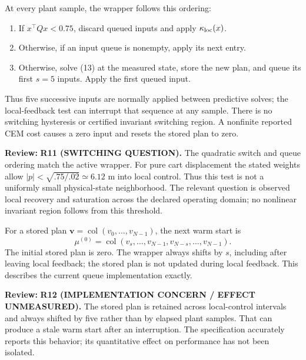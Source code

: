 \documentclass[11pt]{article}
\newcommand{\col}{\operatorname{col}}
\newcommand{\review}[1]{\par\noindent\textcolor{red!70!black}{\textbf{Review:} #1}\par}
\begin{document}
At every plant sample, the wrapper follows this ordering:
\begin{enumerate}
\item If $x^\top Qx<0.75$, discard queued inputs and apply $\kappa_{\rm loc}(x)$.
\item Otherwise, if an input queue is nonempty, apply its next entry.
\item Otherwise, solve (13) at the measured state, store the new plan, and queue its first $s=5$ inputs. Apply the first queued input.
\end{enumerate}
Thus five successive inputs are normally applied between predictive solves; the local-feedback test can interrupt that sequence at any sample. There is no switching hysteresis or certified invariant switching region. A nonfinite reported CEM cost causes a zero input and resets the stored plan to zero.
\review{\textbf{R11 (SWITCHING QUESTION).} The quadratic switch and queue ordering match the active wrapper. For pure cart displacement the stated weights allow $|p|<\sqrt{.75/.02}\simeq6.12$ m into local control. Thus this test is not a uniformly small physical-state neighborhood. The relevant question is observed local recovery and saturation across the declared operating domain; no nonlinear invariant region follows from this threshold.}


For a stored plan $\mathbf v=\col(v_0,\ldots,v_{N-1})$, the next warm start is
\begin{equation}\label{eq:warmstart}
\mu^{(0)}=\col(v_s,\ldots,v_{N-1},v_{N-s},\ldots,v_{N-1}).
\end{equation}
The initial stored plan is zero. The wrapper always shifts by $s$, including after leaving local feedback; the stored plan is not updated during local feedback. This describes the current queue implementation exactly.
\review{\textbf{R12 (IMPLEMENTATION CONCERN / EFFECT UNMEASURED).} The stored plan is retained across local-control intervals and always shifted by five rather than by elapsed plant samples. That can produce a stale warm start after an interruption. The specification accurately reports this behavior; its quantitative effect on performance has not been isolated.}
\end{document}
